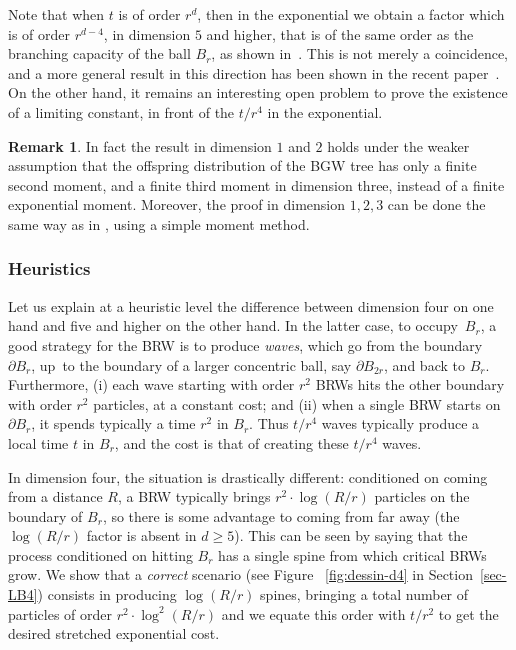 \documentclass[JEP,XML,SOM,Unicode,NoFloatCountersInSection,published]{cedram}
\theoremstyle{plain}
\theoremstyle{definition}
\newtheorem{remark}[theorem]{Remark}
\newcommand{\1}{{\text{\Large $\mathfrak 1$}}}
\begin{document}
Note that when $t$ is of order $r^d$, then in the exponential we obtain a factor which is of order $r^{d-4}$, in dimension $5$ and higher, that is of the same order as the branching capacity of the ball $B_r$, as shown in~\cite{Zhu1}.
This is not merely a coincidence, and a more general result in this direction has been shown in the recent paper~\cite{ASS23}.
On the other hand, it remains an interesting open problem to prove the existence of a limiting constant, in front of the $t/r^4$ in the exponential.

\begin{remark}
In fact the result in dimension $1$ and $2$ holds under the weaker assumption that the offspring distribution of the BGW tree has only a finite second moment, and a finite third moment in dimension three, instead of a finite exponential moment. Moreover, the proof in dimension $1,2,3$ can be done the same way as in \cite{AHJ}, using a simple moment method.
\end{remark}

\subsubsection*{Heuristics}
Let us explain at a heuristic level the difference between
dimension four on one hand and five and higher on the other hand.
In the latter case, to occupy~$B_r$, a good strategy for the BRW is to produce
\emph{waves}, which go from the boundary~$\partial B_r$,
up~to the boundary of a larger concentric ball,
say $\partial B_{2r}$, and back to $B_r$.
Furthermore, (i) each wave starting with order $r^2$ BRWs
hits the other boundary with order $r^2$ particles, at a constant cost; and
(ii) when a single BRW starts on $\partial B_r$,
it spends typically a time $r^2$ in $B_r$.
Thus $t/r^4$ waves typically produce a local time $t$ in $B_r$, and
the cost is that of creating these $t/r^4$ waves.

In dimension four, the situation is drastically different: conditioned
on coming from a distance $R$, a BRW typically brings $r^2\cdot \log(R/r)$ particles on
the boundary of $B_r$, so there is some advantage to coming from
far away (the $\log(R/r)$ factor is absent in $d\ge 5$). This can be seen
by saying that the process conditioned on hitting $B_r$ has a single
spine from which critical BRWs grow. We show that a {\it correct} scenario
(see Figure ~\ref{fig:dessin-d4} in Section~\ref{sec-LB4})
consists in producing $\log(R/r)$ spines, bringing a total number
of particles of order $r^2\cdot \log^2(R/r)$ and we equate this order
with $t/r^2$ to get the desired stretched exponential cost.
\end{document}
